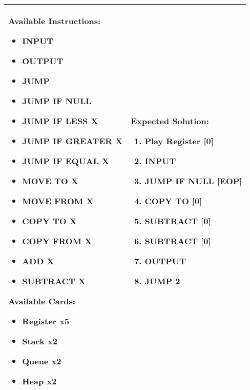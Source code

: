 \begin{center}
    \begin{tabular}{ | m{6cm} | m{8cm} | } 
        \hline
            \textbf{Available Instructions:} 
            \begin{itemize}
                \setlength\itemsep{-.35em}
                \item INPUT
                \item OUTPUT
                \item JUMP
                \item JUMP IF NULL
                \item JUMP IF LESS X
                \item JUMP IF GREATER X
		\item JUMP IF EQUAL X
                \item MOVE TO X
                \item MOVE FROM X
                \item COPY TO X
                \item COPY FROM X
		\item ADD X
		\item SUBTRACT X
            \end{itemize}
            \textbf{Available Cards:} 
            \begin{itemize}
                \setlength\itemsep{-.35em}
                \item Register x5
		\item Stack x2
                \item Queue x2
                \item Heap x2
            \end{itemize}& 
            \textbf{Expected Solution:} 
            \begin{enumerate}
                \setlength\itemsep{-.35em}
		\item Play Register [0]
                \item INPUT
		\item JUMP IF NULL [EOP]
		\item COPY TO [0]
		\item SUBTRACT [0]
		\item SUBTRACT [0]
		\item OUTPUT
		\item JUMP 2
            \end{enumerate}
            \\
        \hline
    \end{tabular}
\end{center}